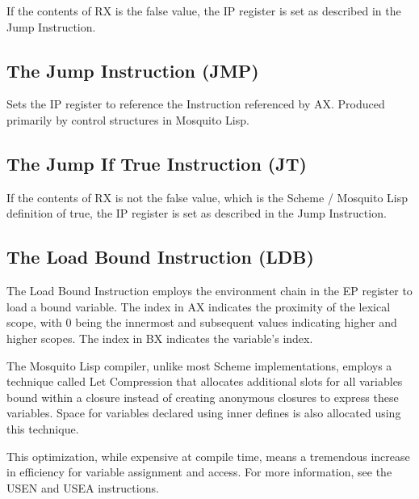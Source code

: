\documentclass[notitlepage,oneside]{book}
\begin{document}
If the contents of RX is the false value, the IP register is set as described in the Jump Instruction.


\subsection{The Jump Instruction (JMP)}
\label{i-jmp}

Sets the IP register to reference the Instruction referenced by AX.  Produced primarily by control structures in Mosquito Lisp.


\subsection{The Jump If True Instruction (JT)}
\label{i-jt}

If the contents of RX is not the false value, which is the Scheme / Mosquito Lisp definition of true, the IP register is set as described in the Jump Instruction.


\subsection{The Load Bound Instruction (LDB)}
\label{i-ldb}

The Load Bound Instruction employs the environment chain in the EP register to load a bound variable.  The index in AX indicates the proximity of the lexical scope, with 0 being the innermost and subsequent values indicating higher and higher scopes.  The index in BX indicates the variable's index.

The Mosquito Lisp compiler, unlike most Scheme implementations, employs a technique called Let Compression that allocates additional slots for all variables bound within a closure instead of creating anonymous closures to express these variables.  Space for variables declared using inner defines is also allocated using this technique.

This optimization, while expensive at compile time, means a tremendous increase in efficiency for variable assignment and access.  For more information, see the USEN and USEA instructions.
\end{document}
